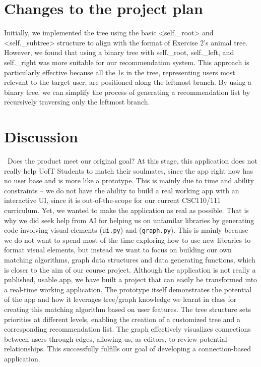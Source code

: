 \documentclass[fontsize=11pt]{article}
\begin{document}
\section{Changes to the project plan}
Initially, we implemented the tree using the basic <self.\_root> and <self.\_subtree> structure to align with the format of Exercise 2's animal tree. However, we found that using a binary tree with self.\_root, self.\_left, and self.\_right was more suitable for our recommendation system. This approach is particularly effective because all the 1s in the tree, representing users most relevant to the target user, are positioned along the leftmost branch. By using a binary tree, we can simplify the process of generating a recommendation list by recursively traversing only the leftmost branch.
\section{Discussion}
\ Does the product meet our original goal?
At this stage, this application does not really help UofT Students to match their soulmates, since the app right now has no user base and is more like a prototype.
This is mainly due to time and ability constraints -- we do not have the ability to build a real working app with an interactive UI, since it is out-of-the-scope for our current CSC110/111 curriculum. Yet, we wanted to make the application as real as possible. That is why we did seek help from AI for helping us on unfamilar libraries by generating code involving visual elements (\texttt{ui.py}) and (\texttt{graph.py}). This is mainly because we do not want to spend most of the time exploring how to use new libraries to format visual elements, but instead we want to focus on building our own matching algorithms, graph data structures and data generating functions, which is closer to the aim of our course project.
Although the application is not really a published, usable app, we have built a project that can easily be transformed into a real-time working application. The prototype itself demonstrates the potential of the app and how it leverages tree/graph knowledge we learnt in class for creating this matching algorithm based on user features. The tree structure sets priorities at different levels, enabling the creation of a customized tree and a corresponding recommendation list. The graph effectively visualizes connections between users through edges, allowing us, as editors, to review potential relationships.
This successfully fulfills our goal of developing a connection-based application.
\end{document}
